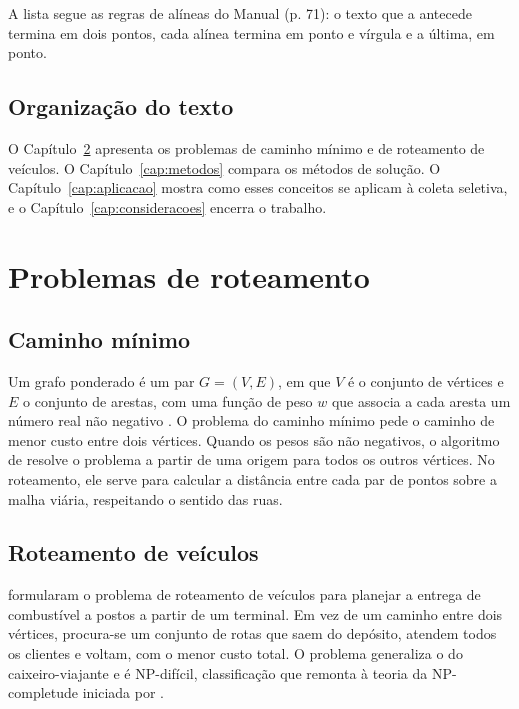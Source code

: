 \documentclass[tid]{texufpel}
\begin{document}
A lista segue as regras de alíneas do Manual (p. 71): o texto que a antecede
termina em dois pontos, cada alínea termina em ponto e vírgula e a última, em
ponto.

\section{Organização do texto}

O Capítulo~\ref{cap:problemas} apresenta os problemas de caminho mínimo e de
roteamento de veículos. O Capítulo~\ref{cap:metodos} compara os métodos de
solução. O Capítulo~\ref{cap:aplicacao} mostra como esses conceitos se
aplicam à coleta seletiva, e o Capítulo~\ref{cap:consideracoes} encerra o
trabalho.

\chapter{Problemas de roteamento}
\label{cap:problemas}

\section{Caminho mínimo}

Um grafo ponderado é um par $G = (V, E)$, em que $V$ é o conjunto de vértices
e $E$ o conjunto de arestas, com uma função de peso $w$ que associa a cada
aresta um número real não negativo \citep{Cormen:2022:IA}. O problema do
caminho mínimo pede o caminho de menor custo entre dois vértices. Quando os
pesos são não negativos, o algoritmo de \citet{Dijkstra:1959:NTP} resolve o
problema a partir de uma origem para todos os outros vértices. No roteamento,
ele serve para calcular a distância entre cada par de pontos sobre a malha
viária, respeitando o sentido das ruas.

\section{Roteamento de veículos}

\citet{Dantzig:1959:TDP} formularam o problema de roteamento de veículos para
planejar a entrega de combustível a postos a partir de um terminal. Em vez de
um caminho entre dois vértices, procura-se um conjunto de rotas que saem do
depósito, atendem todos os clientes e voltam, com o menor custo total. O
problema generaliza o do caixeiro-viajante e é NP-difícil, classificação que
remonta à teoria da NP-completude iniciada por \citet{Cook:1971:CTP}.
\end{document}
